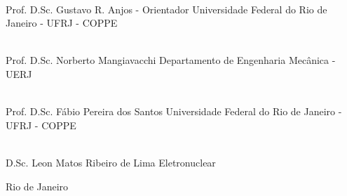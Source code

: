\begin{flushright}
\parbox{12cm}{

\singlespacing

\hrulefill \\

\vspace{-.4cm}
Prof. D.Sc. Gustavo R. Anjos - Orientador
\newline
Universidade Federal do Rio de Janeiro - UFRJ - COPPE
\vspace{.7cm}

\hrulefill \\

\vspace{-.4cm}
Prof. D.Sc. Norberto Mangiavacchi
\newline
Departamento de Engenharia Mecânica - UERJ
\vspace{.7cm}

\hrulefill \\

\vspace{-.4cm}
Prof. D.Sc. Fábio Pereira dos Santos
\newline
Universidade Federal do Rio de Janeiro - UFRJ - COPPE
\vspace{.7cm}

\hrulefill \\

\vspace{-.4cm}
D.Sc. Leon Matos Ribeiro de Lima
\newline
Eletronuclear
\vspace{.7cm}



}
\end{flushright}
\vfill

\begin{center}
Rio de Janeiro\linebreak \curYear
\end{center}
